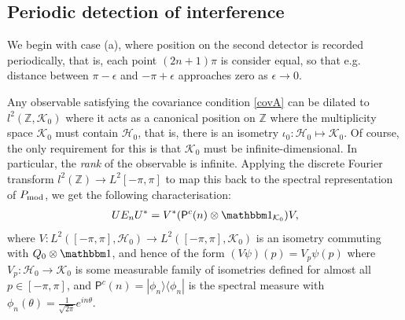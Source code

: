 \subsection{Periodic detection of interference}

We begin with case (a), where position on the second detector is recorded periodically, that is, each point $(2n+1)\pi$ is consider equal, so that e.g. distance between $\pi-\epsilon$ and $-\pi+\epsilon$ approaches zero as $\epsilon\rightarrow 0$.

Any observable satisfying the covariance condition \eqref{covA} can be dilated to $l^2(\mathbb Z, \mathcal K_0)$ where it acts as a canonical position on $\mathbb Z$ \cite{} where the multiplicity space $\mathcal K_0$ must contain $\mathcal H_0$, that is, there is an isometry $\iota_0:\mathcal H_0\mapsto \mathcal K_0$. Of course, the only requirement for this is that $\mathcal K_0$ must be infinite-dimensional. In particular, the \emph{rank} of the observable \cite{JP} is infinite. Applying the discrete Fourier transform $l^2(\mathbb Z)\to L^2[-\pi,\pi]$ to map this back to the spectral representation of $P_{\mathrm{mod}}$, we get the following characterisation:
\newcommand{\Pc}{\mathsf P^c}
\newcommand{\Qd}{Q_d}
\begin{align}
UE_nU^* = V^* (\Pc(n)\otimes \id_{\mathcal K_0})V,
\end{align}
where $V:L^2([-\pi,\pi],\mathcal H_0)\to L^2([-\pi,\pi],\mathcal K_0)$ is an isometry commuting with $Q_0\otimes \id$, and hence of the form $(V\psi)(p) = V_p\psi(p)$ where $V_p:\mathcal H_0\to \mathcal K_0$ is some measurable family of isometries defined for almost all $p\in [-\pi,\pi]$, and $\Pc(n)=|\phi_n\rangle\langle \phi_n|$ is the spectral measure with $\phi_n(\theta) = \frac {1}{\sqrt{2\pi}} e^{in\theta}$.

